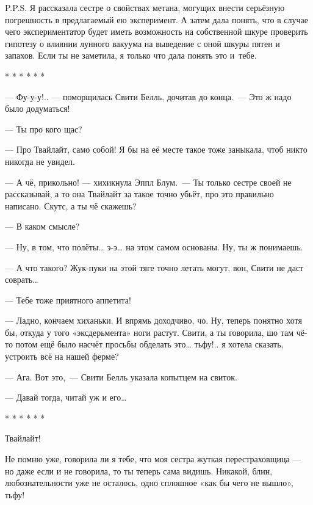 \documentclass[fontsize=11pt,a5paper,titlepage=firstcover]{scrbook}
\begin{document}
P.P.S. Я рассказала сестре о свойствах метана, могущих внести серьёзную погрешность в предлагаемый ею эксперимент. А затем дала понять, что в случае чего экспериментатор будет иметь возможность на собственной шкуре проверить гипотезу о влиянии лунного вакуума на выведение с оной шкуры пятен и запахов. Если ты не заметила, я только что дала понять это и~тебе.

\begin{center}
	* * * * * *
\end{center}
\vspace{2mm}

--- Фу-у-у!.. --- поморщилась Свити Белль, дочитав до конца.~--- Это ж надо было додуматься!

--- Ты про кого щас?

--- Про Твайлайт, само собой! Я бы на её месте такое тоже заныкала, чтоб никто никогда не увидел.

--- А чё, прикольно! --- хихикнула Эппл Блум.~--- Ты только сестре своей не рассказывай, а то она Твайлайт за такое точно убьёт, про это правильно написано. Скутс, а ты чё скажешь?

--- В каком смысле?

--- Ну, в том, что полёты{\ldots} э-э{\ldots} на этом самом основаны. Ну, ты ж понимаешь.

--- А что такого? Жук-пуки на этой тяге точно летать могут, вон, Свити не даст соврать{\ldots}

--- Тебе тоже приятного аппетита!

--- Ладно, кончаем хиханьки. И впрямь доходчиво, чо. Ну, теперь понятно хотя бы, откуда у того «эксдерьмента» ноги растут. Свити, а ты говорила, шо там чё-то потом ещё было насчёт просьбы обделать это{\ldots} тьфу!.. я хотела сказать, устроить всё на нашей ферме?

--- Ага. Вот это,~--- Свити Белль указала копытцем на свиток.

--- Давай тогда, читай уж и его{\ldots}

\begin{center}
	* * * * * *
\end{center}

Твайлайт!

Не помню уже, говорила ли я тебе, что моя сестра жуткая перестраховщица --- но даже если и не говорила, то ты теперь сама видишь. Никакой, блин, любознательности уже не осталось, одно сплошное «как бы чего не вышло», тьфу!
\end{document}
